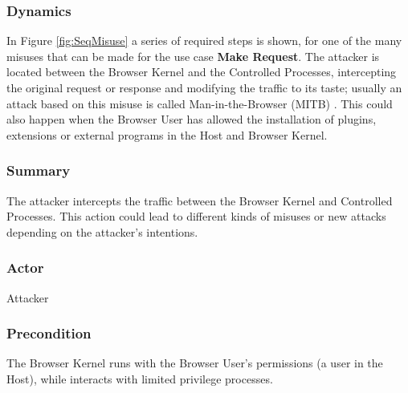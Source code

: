 \documentclass{sig-alternate-05-2015}
\begin{document}
\subsubsection*{Dynamics}
In Figure \ref{fig:SeqMisuse} a series of required steps is shown, for one of the many misuses that can be made for the use case \textbf{Make Request}. The attacker is located between the Browser Kernel and the Controlled Processes, intercepting the original request or response and modifying the traffic to its taste; usually an attack based on this misuse is called Man-in-the-Browser (MITB) \cite{Liu2012, Barth2010, Utakrit2009, Dougan2012}. This could also happen when the Browser User has allowed the installation of plugins, extensions or external programs in the Host and Browser Kernel.
  
  \subsubsection*{Summary} The attacker intercepts the traffic between the Browser Kernel and Controlled Processes. This action could lead to different kinds of misuses or new attacks depending on the attacker's intentions.
  \subsubsection*{Actor} Attacker
  \subsubsection*{Precondition} The Browser Kernel runs with the Browser User's permissions (a user in the Host), while interacts with limited privilege processes.
\end{document}
